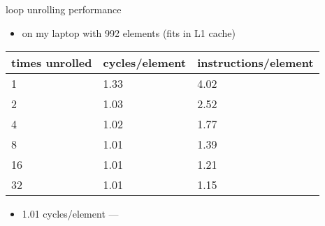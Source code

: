 \begin{frame}{loop unrolling performance}
    \begin{itemize}
        \item on my laptop with 992 elements (fits in L1 cache)
    \end{itemize}
    \begin{tabular}{lll}
        times unrolled & cycles/element & instructions/element\\ \hline
        1              & 1.33 & 4.02 \\
        2              & 1.03 & 2.52 \\
        4              & 1.02 & 1.77 \\
        8              & 1.01 & 1.39 \\
        16             & 1.01 & 1.21 \\
        32             & 1.01 & 1.15 \\
    \end{tabular}
    \begin{itemize}
        \item 1.01 cycles/element --- 
    \end{itemize}
\end{frame}

